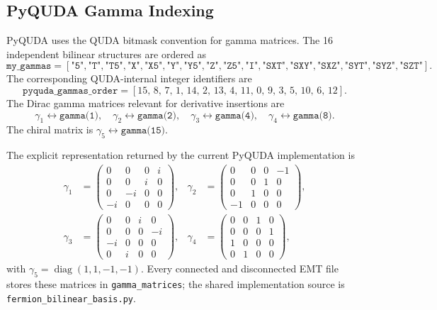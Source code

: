 \documentclass[11pt,a4paper]{article}
\newcommand{\code}[1]{\texttt{#1}}
\begin{document}
\subsection{PyQUDA Gamma Indexing}
\label{sec:gammas}

PyQUDA uses the QUDA bitmask convention for gamma matrices.  The 16 independent
bilinear structures are ordered as
\begin{equation}
  \texttt{my\_gammas} = [\texttt{"5"}, \texttt{"T"}, \texttt{"T5"}, \texttt{"X"},
  \texttt{"X5"}, \texttt{"Y"}, \texttt{"Y5"}, \texttt{"Z"}, \texttt{"Z5"},
  \texttt{"I"}, \texttt{"SXT"}, \texttt{"SXY"}, \texttt{"SXZ"}, \texttt{"SYT"},
  \texttt{"SYZ"}, \texttt{"SZT"}].
\end{equation}
The corresponding QUDA-internal integer identifiers are
\begin{equation}
  \texttt{pyquda\_gammas\_order} = [15,\,8,\,7,\,1,\,14,\,2,\,13,\,4,\,11,\,
  0,\,9,\,3,\,5,\,10,\,6,\,12].
\end{equation}
The Dirac gamma matrices relevant for derivative insertions are
\begin{equation}
  \gamma_{1}\leftrightarrow\texttt{gamma(1)},\quad
  \gamma_{2}\leftrightarrow\texttt{gamma(2)},\quad
  \gamma_{3}\leftrightarrow\texttt{gamma(4)},\quad
  \gamma_{4}\leftrightarrow\texttt{gamma(8)}.
\end{equation}
The chiral matrix is $\gamma_{5}\leftrightarrow\texttt{gamma(15)}$.

The explicit representation returned by the current PyQUDA implementation is
\begin{align}
\gamma_1&=\begin{pmatrix}0&0&0&i\\0&0&i&0\\0&-i&0&0\\-i&0&0&0\end{pmatrix},&
\gamma_2&=\begin{pmatrix}0&0&0&-1\\0&0&1&0\\0&1&0&0\\-1&0&0&0\end{pmatrix},\\
\gamma_3&=\begin{pmatrix}0&0&i&0\\0&0&0&-i\\-i&0&0&0\\0&i&0&0\end{pmatrix},&
\gamma_4&=\begin{pmatrix}0&0&1&0\\0&0&0&1\\1&0&0&0\\0&1&0&0\end{pmatrix},
\end{align}
with $\gamma_5=\operatorname{diag}(1,1,-1,-1)$.  Every connected and
disconnected EMT file stores these matrices in \code{gamma\_matrices}; the
shared implementation source is \code{fermion\_bilinear\_basis.py}.
\end{document}
